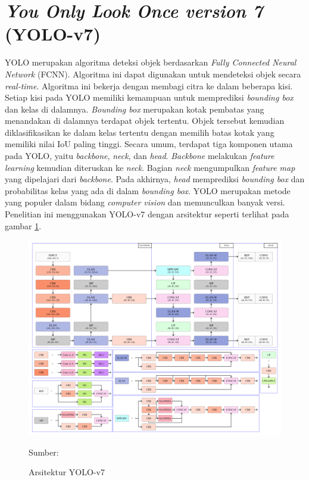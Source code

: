 \section{\textit{You Only Look Once version 7} (YOLO-v7)}
YOLO merupakan algoritma deteksi objek berdasarkan \textit{Fully Connected Neural Network} (FCNN). Algoritma ini dapat digunakan untuk mendeteksi objek secara \textit{real-time}. Algoritma ini bekerja dengan membagi citra ke dalam beberapa kisi. Setiap kisi pada YOLO memiliki kemampuan untuk memprediksi \textit{bounding box} dan kelas di dalamnya. \textit{Bounding box} merupakan kotak pembatas yang menandakan di dalamnya terdapat objek tertentu. Objek tersebut kemudian diklasifikasikan ke dalam kelas tertentu dengan memilih batas kotak yang memiliki nilai IoU paling tinggi. Secara umum, terdapat tiga komponen utama pada YOLO, yaitu \textit{backbone}, \textit{neck}, dan \textit{head}. \textit{Backbone} melakukan \textit{feature learning} kemudian diteruskan ke \textit{neck}. Bagian \textit{neck} mengumpulkan \textit{feature map} yang dipelajari dari \textit{backbone}. Pada akhirnya, \textit{head} memprediksi \textit{bounding box} dan probabilitas kelas yang ada di dalam \textit{bounding box}. YOLO merupakan metode yang populer dalam bidang \textit{computer vision} dan memunculkan banyak versi. Penelitian ini menggunakan YOLO-v7 dengan arsitektur seperti terlihat pada gambar \ref{fig:yolov7-archi}.
\begin{figure}[H]
    \begin{center}
        \includegraphics[width=13cm]{../img/YOLO-v7-Architecture.png}
        \caption{Arsitektur YOLO-v7}
        \label{fig:yolov7-archi}
        Sumber: \citep{Wang2022}
    \end{center}
\end{figure}


